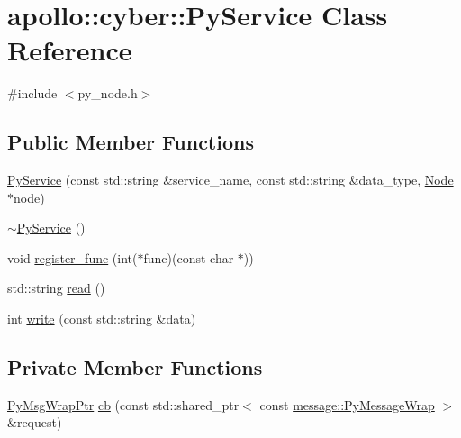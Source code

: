\hypertarget{classapollo_1_1cyber_1_1PyService}{\section{apollo\-:\-:cyber\-:\-:Py\-Service Class Reference}
\label{classapollo_1_1cyber_1_1PyService}
}


{\ttfamily \#include $<$py\-\_\-node.\-h$>$}

\subsection*{Public Member Functions}
\begin{DoxyCompactItemize}
\item 
\hyperlink{classapollo_1_1cyber_1_1PyService_a9d1ef7f49583e013e84b9ad7579740e5}{Py\-Service} (const std\-::string \&service\-\_\-name, const std\-::string \&data\-\_\-type, \hyperlink{classapollo_1_1cyber_1_1Node}{Node} $\ast$node)
\item 
\hyperlink{classapollo_1_1cyber_1_1PyService_ae063591fa991821b4b4c38b3c303b42c}{$\sim$\-Py\-Service} ()
\item 
void \hyperlink{classapollo_1_1cyber_1_1PyService_a5cfbdcf741b619e1d9bb4f191934aeb5}{register\-\_\-func} (int($\ast$func)(const char $\ast$))
\item 
std\-::string \hyperlink{classapollo_1_1cyber_1_1PyService_ae1deb060e2023beef0e4d944037db7e1}{read} ()
\item 
int \hyperlink{classapollo_1_1cyber_1_1PyService_a810410082a599d26d0f3e0b4acd6dd38}{write} (const std\-::string \&data)
\end{DoxyCompactItemize}
\subsection*{Private Member Functions}
\begin{DoxyCompactItemize}
\item 
\hyperlink{namespaceapollo_1_1cyber_a1152fb39339af5618cb8e3a7afc89703}{Py\-Msg\-Wrap\-Ptr} \hyperlink{classapollo_1_1cyber_1_1PyService_a591d16ed9d1a0f7dffb6da7a8a29ab9c}{cb} (const std\-::shared\-\_\-ptr$<$ const \hyperlink{classapollo_1_1cyber_1_1message_1_1PyMessageWrap}{message\-::\-Py\-Message\-Wrap} $>$ \&request)
\end{DoxyCompactItemize}
